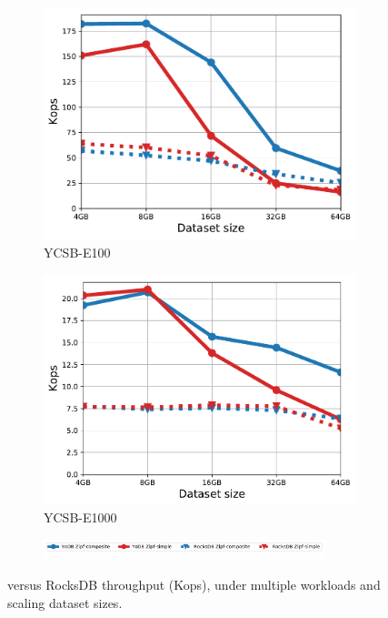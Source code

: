 \begin{figure}[tb]
\begin{subfigure}{0.3\linewidth}
\label{fig:throughput:e10}
\end{subfigure}
\begin{subfigure}{0.3\linewidth}
\includegraphics[width=\textwidth]{figs/Workload_E_line.pdf}
\caption{YCSB-E100}
\label{fig:throughput:e100}
\end{subfigure}
\begin{subfigure}{0.3\linewidth}
\includegraphics[width=\textwidth]{figs/Workload_E+_line.pdf}
\caption{YCSB-E1000}
\label{fig:throughput:e1000}
\end{subfigure}
\begin{subfigure}{\linewidth}
\centerline{
\includegraphics[width=0.9\textwidth]{figs/legend.pdf}
\vspace{-5mm}
}
\end{subfigure}
\caption{
{\sys\/ versus RocksDB throughput (Kops), under multiple workloads and scaling dataset sizes.}
}
\label{fig:throughput}
\end{figure}

